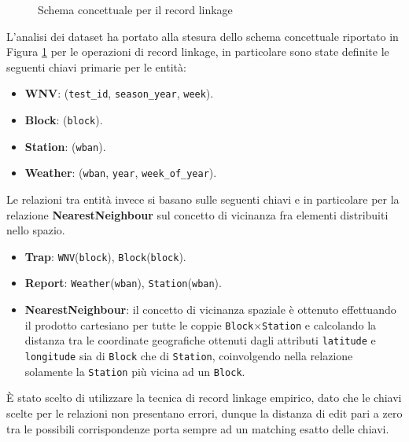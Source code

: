 \begin{figure}[h]
    \centering
    \def\svgwidth{\columnwidth}
    \scalebox{.5}{
        
    }
    \label{fig:er-schema}
    \caption{Schema concettuale per il record linkage}
\end{figure}

L'analisi dei dataset ha portato alla stesura dello schema concettuale 
riportato in Figura \ref{fig:er-schema} per le operazioni di record linkage, in 
particolare sono state definite le seguenti chiavi primarie per le entità:

\begin{itemize}
    \item \textbf{WNV}: (\texttt{test\_id}, \texttt{season\_year}, 
    \texttt{week}).

    \item \textbf{Block}: (\texttt{block}).
    
    \item \textbf{Station}: (\texttt{wban}).
    
    \item \textbf{Weather}: (\texttt{wban}, \texttt{year}, 
    \texttt{week\_of\_year}).

\end{itemize}


Le relazioni tra entità invece si basano sulle seguenti chiavi e in particolare 
per la relazione \textbf{NearestNeighbour} sul concetto di vicinanza fra 
elementi distribuiti nello spazio.

\begin{itemize}
    \item \textbf{Trap}: \texttt{WNV}(\texttt{block}), 
    \texttt{Block}(\texttt{block}).

    \item \textbf{Report}:  \texttt{Weather}(\texttt{wban}), 
    \texttt{Station}(\texttt{wban}).
    
    \item \textbf{NearestNeighbour}: il concetto di vicinanza spaziale è 
    ottenuto effettuando il prodotto cartesiano per tutte le coppie
    \texttt{Block}$\times$\texttt{Station} e calcolando la distanza tra le 
    coordinate geografiche ottenuti dagli attributi \texttt{latitude} e 
    \texttt{longitude} sia di \texttt{Block} che di \texttt{Station},
    coinvolgendo nella relazione solamente la \texttt{Station} più vicina ad 
    un \texttt{Block}.

\end{itemize}

È stato scelto di utilizzare la tecnica di record linkage empirico, dato che 
le chiavi scelte per le relazioni non presentano errori, dunque la distanza di 
edit pari a zero tra le possibili corrispondenze porta sempre ad un matching 
esatto delle chiavi.
